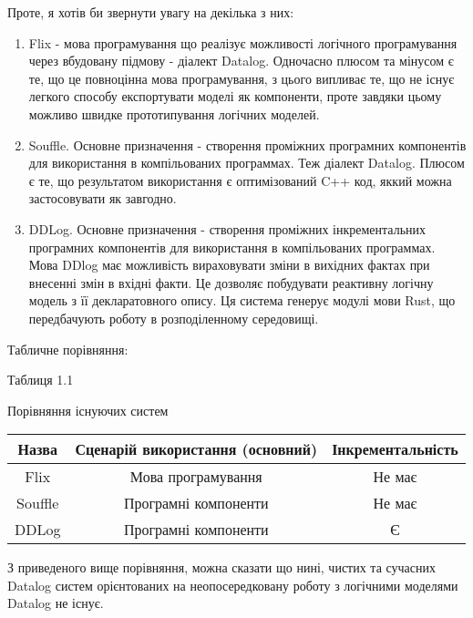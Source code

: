 Проте, я хотів би звернути увагу на декілька з них:

\begin{enumerate}

\item Flix\cite{flix} -  мова програмування що реалізує можливості логічного програмування через вбудовану підмову - діалект Datalog. Одночасно плюсом та мінусом є те, що це повноцінна мова програмування, з цього випливає те, що не існує легкого способу експортувати моделі як компоненти, проте завдяки цьому можливо швидке прототипування логічних моделей.

\item Souffle\cite{souffle}. Основне призначення - створення проміжних програмних компонентів для використання в компільованих программах. Теж діалект Datalog. Плюсом є те, що результатом використання є оптимізований C++ код, яккий можна застосовувати як завгодно.

\item DDLog\cite{ddlog}. Основне призначення - створення проміжних інкрементальних програмних компонентів для використання в компільованих программах. Мова DDlog має можливість вираховувати зміни в вихідних фактах при внесенні змін в вхідні факти. Це дозволяє побудувати реактивну логічну модель з її декларатовного опису. Ця система генерує модулі мови Rust, що передбачують роботу в розподіленному середовищі.

\end{enumerate}

Табличне порівняння: 

\begin{flushright}\small {Таблиця 1.1} \end{flushright}
\begin{center}
Порівняння існуючих систем
\small{
\begin{tabular}{ | c | c | c |  }
\hline
 Назва & Сценарій використання (основний)  & Інкрементальність \\ 
\hline
 Flix & Мова програмування & Не має \\  
\hline
 Souffle & Програмні компоненти & Не має \\  
\hline
 DDLog & Програмні компоненти & Є \\  
\hline
\end{tabular}
}
\end{center}

З приведеного вище порівняння, можна сказати що нині, чистих та сучасних Datalog систем орієнтованих на неопосередковану роботу з логічними моделями Datalog не існує.

